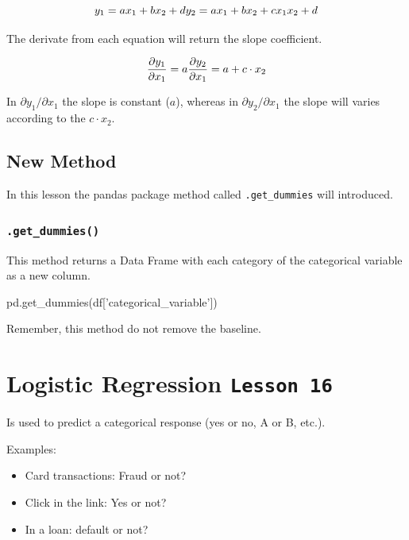 \documentclass[]{book}
\newenvironment{Shaded}{\begin{snugshade}}{\end{snugshade}}
\newcommand{\StringTok}[1]{\textcolor[rgb]{0.31,0.60,0.02}{#1}}
\newcommand{\NormalTok}[1]{#1}
\providecommand{\tightlist}{%
  \setlength{\itemsep}{0pt}\setlength{\parskip}{0pt}}
\begin{document}
\[y_1 = ax_1 + bx_2 + d \\
  y_2 = ax_1 + bx_2 + cx_1x_2 + d\]

The derivate from each equation will return the slope coefficient.

\[\frac{\partial y_1}{\partial x_1} = a \\
  \frac{\partial y_2}{\partial x_1} = a + c \cdot x_2\]

In \(\partial y_1/\partial x_1\) the slope is constant (\(a\)), whereas
in \(\partial y_2/\partial x_1\) the slope will varies according to the
\(c \cdot x_2\).

\subsection{New Method}\label{new-method}

In this lesson the pandas package method called \texttt{.get\_dummies}
will introduced.

\subsubsection{\texorpdfstring{\texttt{.get\_dummies()}}{.get\_dummies()}}\label{get_dummies}

This method returns a Data Frame with each category of the categorical
variable as a new column.

\begin{Shaded}
\begin{Highlighting}[]
\NormalTok{pd.get_dummies(df[}\StringTok{'categorical_variable'}\NormalTok{])}
\end{Highlighting}
\end{Shaded}

Remember, this method do not remove the baseline.

\section{\texorpdfstring{Logistic Regression
\texttt{Lesson\ 16}}{Logistic Regression Lesson 16}}\label{logistic-regression-lesson-16}

Is used to predict a categorical response (yes or no, A or B, etc.).

Examples:

\begin{itemize}
\tightlist
\item
  Card transactions: Fraud or not?
\item
  Click in the link: Yes or not?
\item
  In a loan: default or not?
\end{itemize}
\end{document}
